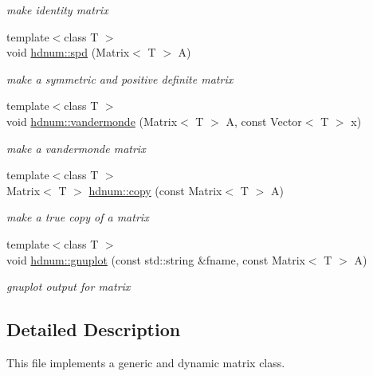 \begin{DoxyCompactItemize}
\begin{DoxyCompactList}\small\item\em make identity matrix \item\end{DoxyCompactList}\item 
\hypertarget{namespacehdnum_af256a37b2e460e8dc1e0e8b0f107ce93}{
{\footnotesize template$<$class T $>$ }\\void \hyperlink{namespacehdnum_af256a37b2e460e8dc1e0e8b0f107ce93}{hdnum::spd} (Matrix$<$ T $>$ A)}
\label{namespacehdnum_af256a37b2e460e8dc1e0e8b0f107ce93}

\begin{DoxyCompactList}\small\item\em make a symmetric and positive definite matrix \item\end{DoxyCompactList}\item 
\hypertarget{namespacehdnum_a939222f806c615507d7f3dd350a5b899}{
{\footnotesize template$<$class T $>$ }\\void \hyperlink{namespacehdnum_a939222f806c615507d7f3dd350a5b899}{hdnum::vandermonde} (Matrix$<$ T $>$ A, const Vector$<$ T $>$ x)}
\label{namespacehdnum_a939222f806c615507d7f3dd350a5b899}

\begin{DoxyCompactList}\small\item\em make a vandermonde matrix \item\end{DoxyCompactList}\item 
\hypertarget{namespacehdnum_aefa0119f491196c0afb3a29057fdd5cf}{
{\footnotesize template$<$class T $>$ }\\Matrix$<$ T $>$ \hyperlink{namespacehdnum_aefa0119f491196c0afb3a29057fdd5cf}{hdnum::copy} (const Matrix$<$ T $>$ A)}
\label{namespacehdnum_aefa0119f491196c0afb3a29057fdd5cf}

\begin{DoxyCompactList}\small\item\em make a true copy of a matrix \item\end{DoxyCompactList}\item 
\hypertarget{namespacehdnum_a47e5748b68246cf6604e355a070ed134}{
{\footnotesize template$<$class T $>$ }\\void \hyperlink{namespacehdnum_a47e5748b68246cf6604e355a070ed134}{hdnum::gnuplot} (const std::string \&fname, const Matrix$<$ T $>$ A)}
\label{namespacehdnum_a47e5748b68246cf6604e355a070ed134}

\begin{DoxyCompactList}\small\item\em gnuplot output for matrix \item\end{DoxyCompactList}\end{DoxyCompactItemize}


\subsection{Detailed Description}
This file implements a generic and dynamic matrix class. 